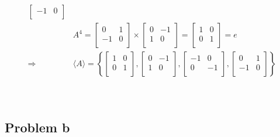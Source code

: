 \documentclass{article}
\begin{document}
\begin{equation*}
\begin{split}
\begin{bmatrix}
            -1&0\\
        \end{bmatrix}\\
        &A^4=\begin{bmatrix}
            0&1\\
            -1&0\\
        \end{bmatrix}\times\begin{bmatrix}
            0&-1\\
            1&0\\
        \end{bmatrix}=\begin{bmatrix}
            1&0\\
            0&1\\
        \end{bmatrix}=e\\
        \Rightarrow&\langle A\rangle=\left\{\begin{bmatrix}
            1&0\\
            0&1\\
        \end{bmatrix},\begin{bmatrix}
            0&-1\\
            1&0\\
        \end{bmatrix},\begin{bmatrix}
            -1&0\\
            0&-1\\
        \end{bmatrix},\begin{bmatrix}
            0&1\\
            -1&0\\
        \end{bmatrix}\right\}\\
    \end{split}
\end{equation*}

~

\subsection*{Problem b}
\end{document}
